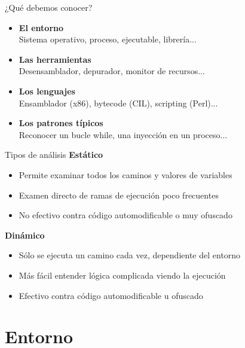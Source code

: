 \documentclass{beamer}
\begin{document}
\begin{frame}{¿Qué debemos conocer?}
\begin{itemize}
\item \textbf{El entorno} \\ \hspace{4ex}Sistema operativo, proceso, ejecutable, librería...
\item \textbf{Las herramientas} \\ \hspace{4ex}Desensamblador, depurador, monitor de recursos...
\item \textbf{Los lenguajes} \\ \hspace{4ex}Ensamblador (x86), bytecode (CIL), scripting (Perl)...
\item \textbf{Los patrones típicos} \\ \hspace{4ex}Reconocer un bucle while, una inyección en un proceso...
\end{itemize}

\end{frame}

\begin{frame}{Tipos de análisis}
\vspace{-3ex}
\textbf{Estático}
\begin{itemize}
	\item Permite examinar todos los caminos y valores de variables
	\item Examen directo de ramas de ejecución poco frecuentes
	\item No efectivo contra código automodificable o muy ofuscado
\end{itemize}
\textbf{Dinámico}
\begin{itemize}
	\item Sólo se ejecuta un camino cada vez, dependiente del entorno
	\item Más fácil entender lógica complicada viendo la ejecución
	\item Efectivo contra código automodificable u ofuscado
\end{itemize}

\end{frame}

\section{Entorno}
\end{document}
